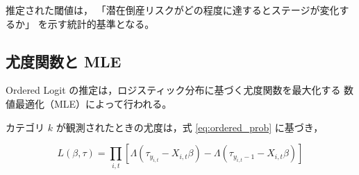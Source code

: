 推定された閾値は，
「潜在倒産リスクがどの程度に達するとステージが変化するか」
を示す統計的基準となる。


\subsection{尤度関数と MLE}

Ordered Logit の推定は，ロジスティック分布に基づく尤度関数を最大化する
数値最適化（MLE）によって行われる。

カテゴリ $k$ が観測されたときの尤度は，式 \eqref{eq:ordered_prob} に基づき，

\begin{equation}
L(\beta, \tau)
=
\prod_{i,t}
\left[
\Lambda(\tau_{y_{i,t}} - X_{i,t}\beta)
-
\Lambda(\tau_{y_{i,t}-1} - X_{i,t}\beta)
\right]
\label{eq:ordered_likelihood}
\end{equation}
